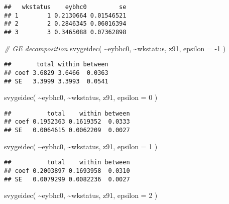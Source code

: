 \documentclass[
]{book}
\newenvironment{Shaded}{\begin{snugshade}}{\end{snugshade}}
\newcommand{\AttributeTok}[1]{\textcolor[rgb]{0.77,0.63,0.00}{#1}}
\newcommand{\CommentTok}[1]{\textcolor[rgb]{0.56,0.35,0.01}{\textit{#1}}}
\newcommand{\DecValTok}[1]{\textcolor[rgb]{0.00,0.00,0.81}{#1}}
\newcommand{\FunctionTok}[1]{\textcolor[rgb]{0.00,0.00,0.00}{#1}}
\newcommand{\NormalTok}[1]{#1}
\newcommand{\SpecialCharTok}[1]{\textcolor[rgb]{0.00,0.00,0.00}{#1}}
\begin{document}
\begin{verbatim}
##   wkstatus    eybhc0         se
## 1        1 0.2130664 0.01546521
## 2        2 0.2846345 0.06016394
## 3        3 0.3465088 0.07362898
\end{verbatim}

\begin{Shaded}
\begin{Highlighting}[]
\CommentTok{\# GE decomposition}
\FunctionTok{svygeidec}\NormalTok{( }\SpecialCharTok{\textasciitilde{}}\NormalTok{eybhc0, }\SpecialCharTok{\textasciitilde{}}\NormalTok{wkstatus, z91, }\AttributeTok{epsilon =} \SpecialCharTok{{-}}\DecValTok{1}\NormalTok{ )}
\end{Highlighting}
\end{Shaded}

\begin{verbatim}
##       total within between
## coef 3.6829 3.6466  0.0363
## SE   3.3999 3.3993  0.0541
\end{verbatim}

\begin{Shaded}
\begin{Highlighting}[]
\FunctionTok{svygeidec}\NormalTok{( }\SpecialCharTok{\textasciitilde{}}\NormalTok{eybhc0, }\SpecialCharTok{\textasciitilde{}}\NormalTok{wkstatus, z91, }\AttributeTok{epsilon =} \DecValTok{0}\NormalTok{ )}
\end{Highlighting}
\end{Shaded}

\begin{verbatim}
##          total    within between
## coef 0.1952363 0.1619352  0.0333
## SE   0.0064615 0.0062209  0.0027
\end{verbatim}

\begin{Shaded}
\begin{Highlighting}[]
\FunctionTok{svygeidec}\NormalTok{( }\SpecialCharTok{\textasciitilde{}}\NormalTok{eybhc0, }\SpecialCharTok{\textasciitilde{}}\NormalTok{wkstatus, z91, }\AttributeTok{epsilon =} \DecValTok{1}\NormalTok{ )}
\end{Highlighting}
\end{Shaded}

\begin{verbatim}
##          total    within between
## coef 0.2003897 0.1693958  0.0310
## SE   0.0079299 0.0082236  0.0027
\end{verbatim}

\begin{Shaded}
\begin{Highlighting}[]
\FunctionTok{svygeidec}\NormalTok{( }\SpecialCharTok{\textasciitilde{}}\NormalTok{eybhc0, }\SpecialCharTok{\textasciitilde{}}\NormalTok{wkstatus, z91, }\AttributeTok{epsilon =} \DecValTok{2}\NormalTok{ )}
\end{Highlighting}
\end{Shaded}
\end{document}
